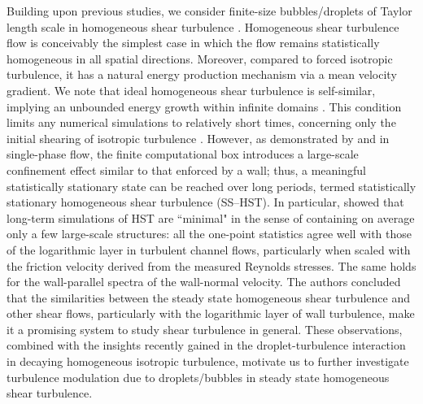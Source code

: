 Building upon previous studies, we consider finite-size bubbles/droplets of Taylor length scale in homogeneous shear turbulence \citep{tavoularis_corrsin_1981b, tavoularis_corrsin_1981a, pumir_1996a, mashayek_1998a, sekimoto_dong_jimenez_2016a}. Homogeneous shear turbulence flow is conceivably the simplest case in which the flow remains statistically homogeneous in all spatial directions. Moreover, compared to forced isotropic turbulence, it has a natural energy production mechanism via a mean velocity gradient. We note that ideal homogeneous shear turbulence is self-similar, implying an unbounded energy growth within infinite domains \citep{sukheswalla_vaithianathan_collins_2013a}. This condition limits any numerical simulations to relatively short times, concerning only the initial shearing of isotropic turbulence \citep{rogers_moin_1987a, lee_kim_moin_1990a, sukheswalla_vaithianathan_collins_2013a}. However, as demonstrated by \cite{pumir_1996a} and \cite{sekimoto_dong_jimenez_2016a} in single-phase flow, the finite computational box introduces a large-scale confinement effect similar to that enforced by a wall; thus, a meaningful statistically stationary state can be reached over long periods, termed statistically stationary homogeneous shear turbulence (SS--HST). In particular, \cite{sekimoto_dong_jimenez_2016a} showed that long-term simulations of HST are ``minimal" in the sense of containing on average only a few large-scale structures: all the one-point statistics agree well with those of the logarithmic layer in turbulent channel flows, particularly when scaled with the friction velocity derived from the measured Reynolds stresses. The same holds for the wall-parallel spectra of the wall-normal velocity. The authors concluded that the similarities between the steady state homogeneous shear turbulence and other shear flows, particularly with the logarithmic layer of wall turbulence, make it a promising system to study shear turbulence in general. These observations, combined with the insights recently gained in the droplet-turbulence interaction in decaying homogeneous isotropic turbulence, motivate us to further investigate turbulence modulation due to droplets/bubbles in steady state homogeneous shear turbulence.

